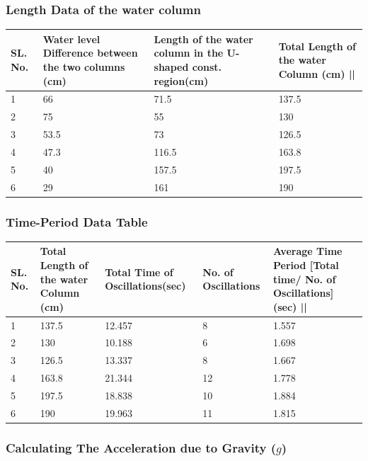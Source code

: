 \documentclass[twocolumn,11pt]{article}
\begin{document}
\subsubsection{Length Data of the water column}
\begin{center}
\begin{tabular}{||p{0.5cm} | p{2cm}| p{2cm}| p{2cm} ||} 
 \hline
 SL. No. & Water level Difference between the two columns (cm) & Length of the water column in the U-shaped const. region(cm) & Total Length of the water Column (cm) ||\\ 
 \hline\hline
 1 & 66 & 71.5 & 137.5 \\ 
 \hline
 2 & 75 & 55 & 130 \\
 \hline
 3 & 53.5 & 73 & 126.5\\
 \hline
 4 & 47.3 &  116.5 & 163.8 \\
 \hline
 5 & 40 & 157.5 & 197.5  \\ 
 \hline
 6 & 29 & 161 & 190\\
 \hline
 \hline
\end{tabular}
\end{center}

\subsubsection{Time-Period Data Table}

\begin{center}
\begin{tabular}{||p{0.5cm} | p{1.5cm}| p{1.5cm}| p{0.5cm} |p{2cm}||} 
 \hline
 SL. No. & Total Length of the water Column (cm) & Total Time of Oscillations(sec) & No. of Oscillations & Average Time Period [Total time/ No. of Oscillations] (sec) ||\\ [0.5ex] 
 \hline\hline
 1 & 137.5 & 12.457 & 8 & 1.557 \\ 
 \hline
 2 & 130 & 10.188 & 6 & 1.698 \\
 \hline
 3 & 126.5 & 13.337 & 8 & 1.667\\
 \hline
 4 & 163.8 & 21.344 &12 & 1.778 \\
 \hline
 5 & 197.5 & 18.838 & 10 & 1.884\\
 \hline
 6 & 190 & 19.963 & 11 & 1.815 \\
 \hline
 \hline
\end{tabular}
\end{center}


\subsubsection{Calculating The Acceleration due to Gravity ($g$)}
\end{document}
